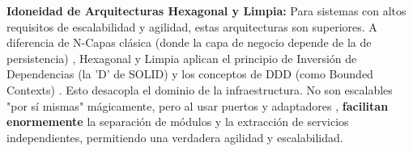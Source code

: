 \textbf{Idoneidad de Arquitecturas Hexagonal y Limpia:} Para sistemas con altos requisitos de escalabilidad y agilidad, estas arquitecturas son superiores. A diferencia de N-Capas clásica (donde la capa de negocio depende de la de persistencia) \parencite{richards2015}, Hexagonal \parencite{cockburn2005} y Limpia \parencite{martin2017} aplican el principio de Inversión de Dependencias (la 'D' de SOLID) \parencite{martin2017} y los conceptos de DDD (como Bounded Contexts) \parencite{evans2003}. Esto desacopla el dominio de la infraestructura. No son escalables "por sí mismas" mágicamente, pero al usar puertos y adaptadores \parencite{cockburn2005}, \textbf{facilitan enormemente} la separación de módulos y la extracción de servicios independientes, permitiendo una verdadera agilidad y escalabilidad.